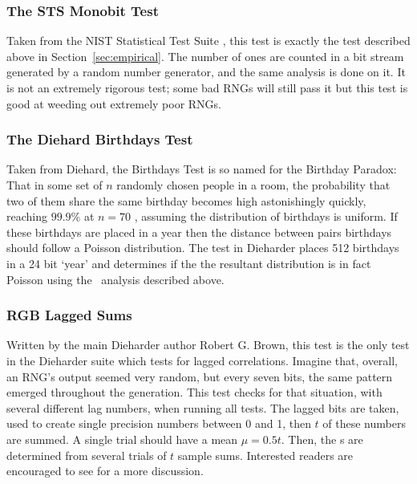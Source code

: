 

\subsubsection{The STS Monobit Test}
Taken from the NIST Statistical Test Suite \cite{nisttoolkit}, this test is exactly the test described above in Section~\ref{sec:empirical}. The number of ones are counted in a bit stream generated by a random number generator, and the same analysis is done on it. It is not an extremely rigorous test; some bad RNGs will still pass it but this test is good at weeding out extremely poor RNGs.

\subsubsection{The Diehard Birthdays Test}
Taken from Diehard, the Birthdays Test is so named for the Birthday Paradox: That in some set of $n$ randomly chosen people in a room, the probability that two of them share the same birthday becomes high astonishingly quickly, reaching $99.9\%$ at $n=70$ \cite{abramson1970more}, assuming the distribution of birthdays is uniform. If these birthdays are placed in a year then the distance between pairs birthdays should follow a Poisson distribution. The test in Dieharder places 512 birthdays in a 24 bit `year' and determines if the the resultant distribution is in fact Poisson using the \pvalue~analysis described above.

\subsubsection{RGB Lagged Sums}
Written by the main Dieharder author Robert G. Brown, this test is the only test in the Dieharder suite which tests for lagged correlations. Imagine that, overall, an RNG's output seemed very random, but every seven bits, the same pattern emerged throughout the generation. This test checks for that situation, with several different lag numbers, when running all tests. The lagged bits are taken, used to create single precision numbers between 0 and 1, then $t$ of these numbers are summed. A single trial should have a mean $\mu = 0.5 t$. Then, the \pvalue s are determined from several trials of $t$ sample sums. Interested readers are encouraged to see \cite{dieharder_manual} for a more discussion.

